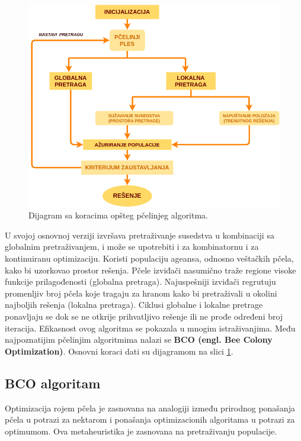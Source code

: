 \documentclass[a4paper]{article}
\begin{document}
{\begin{figure}[h!]
\begin{center}
\includegraphics[scale=0.29]{dijagram.png}
\end{center}
\caption{Dijagram sa koracima opšteg pčelinjeg algoritma.}
\label{fig:dij}
\end{figure}
U svojoj osnovnoj verziji izvršava pretraživanje susedstva u kombinaciji sa globalnim pretraživanjem, i može se upotrebiti i za kombinatornu i za kontinuiranu optimizaciju. Koristi populaciju ageansa, odnosno veštačkih pčela, kako bi uzorkovao prostor rešenja\cite{bcoalg}. Pčele izviđači nasumično traže regione visoke funkcije prilagođenosti (globalna pretraga). Najuspešniji izviđači regrutuju promenljiv broj pčela koje tragaju za hranom kako bi pretraživali u okolini najboljih rešenja (lokalna pretraga).
Ciklusi globalne i lokalne pretrage ponavljaju se dok se ne otkrije prihvatljivo rešenje ili ne prođe određeni broj iteracija. Efikasnost ovog algoritma se pokazala u mnogim istraživanjima. 
Među najpoznatijim pčelinjim algoritmima nalazi se \textbf{BCO (engl. Bee Colony Optimization)}.
Osnovni koraci dati su dijagramom na slici \ref{fig:dij}.

\subsection{BCO algoritam}
\label{subsec:bco}
Optimizacija rojem pčela je zasnovana na analogiji između prirodnog ponašanja pčela u potrazi za nektarom i ponašanja optimizacionih algoritama u potrazi za optimumom\cite{bcoalg}. Ova metaheuristika je zasnovana na pretraživanju populacije. 

}
\end{document}
